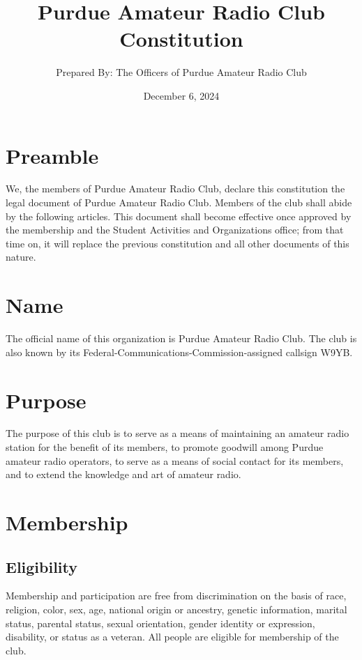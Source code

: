 \documentclass{article}
\title{\vspace*{\fill}Purdue Amateur Radio Club Constitution}
\author{Prepared By: The Officers of Purdue Amateur Radio Club}
\date{December 6, 2024\vspace*{\fill}\vspace*{\fill}}
\begin{document}
\maketitle

\newpage
\tableofcontents

\newpage
\setcounter{section}{-1}
\section{Preamble}

We, the members of Purdue Amateur Radio Club, declare this constitution the
legal document of Purdue Amateur Radio Club. Members of the club shall abide by
the following articles. This document shall become effective once approved by
the membership and the Student Activities and Organizations office; from that
time on, it will replace the previous constitution and all other documents of
this nature.

\section{Name}

The official name of this organization is Purdue Amateur Radio Club. The club is
also known by its Federal-Communications-Commission-assigned callsign W9YB.

\section{Purpose}

The purpose of this club is to serve as a means of maintaining an amateur radio
station for the benefit of its members, to promote goodwill among Purdue amateur
radio operators, to serve as a means of social contact for its members, and to
extend the knowledge and art of amateur radio.

\section{Membership}

\subsection{Eligibility}

Membership and participation are free from discrimination on the basis of race,
religion, color, sex, age, national origin or ancestry, genetic information,
marital status, parental status, sexual orientation, gender identity or
expression, disability, or status as a veteran. All people are eligible for
membership of the club.
\end{document}
